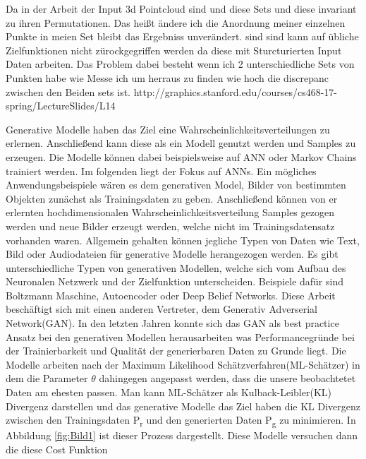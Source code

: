 \documentclass{llncs}
\begin{document}
Da in der Arbeit der Input 3d Pointcloud sind und diese Sets und diese invariant zu ihren Permutationen. Das heißt ändere ich die Anordnung meiner einzelnen Punkte in meien Set bleibt das Ergebniss unverändert.  sind sind kann auf übliche Zielfunktionen nicht zürockgegriffen werden da diese mit Sturcturierten Input Daten arbeiten. Das Problem dabei besteht wenn ich 2 unterschiedliche Sets von Punkten habe wie Messe ich um herraus zu finden wie hoch die discrepanc zwischen den Beiden sets ist. 
http://graphics.stanford.edu/courses/cs468-17-spring/LectureSlides/L14%

Generative Modelle haben das Ziel eine Wahrscheinlichkeitsverteilungen zu erlernen. Anschließend kann diese als ein Modell genutzt werden und Samples zu erzeugen. Die Modelle können dabei beispielsweise auf ANN oder Markov Chains trainiert werden\cite{Grundlagen}. Im folgenden liegt der Fokus auf ANNs. Ein mögliches Anwendungsbeispiele wären es dem generativen Model, Bilder von bestimmten Objekten zunächst als Trainingsdaten zu geben. Anschließend können von er erlernten hochdimensionalen Wahrscheinlichkeitsverteilung Samples gezogen werden und neue Bilder erzeugt werden, welche nicht im Trainingsdatensatz vorhanden waren. Allgemein gehalten können jegliche Typen von Daten wie Text, Bild oder Audiodateien für generative Modelle herangezogen werden. Es gibt unterschiedliche Typen von generativen Modellen, welche sich vom Aufbau des Neuronalen Netzwerk und der Zielfunktion unterscheiden. Beispiele dafür sind Boltzmann Maschine, Autoencoder oder Deep Belief Networks\cite{Grundlagen}. Diese Arbeit beschäftigt sich mit einen anderen Vertreter, dem Generativ Adverserial Network(GAN). In den letzten Jahren konnte sich das GAN als best practice Ansatz bei den generativen Modellen herausarbeiten was Performancegründe bei der Trainierbarkeit und Qualität der generierbaren Daten zu Grunde liegt\cite{Grundlagen}. 
Die Modelle arbeiten nach der Maximum Likelihood Schätzverfahren(ML-Schätzer) in dem die Parameter $\theta$ dahingegen angepasst werden, dass die unsere beobachtetet Daten am ehesten passen. Man kann ML-Schätzer als Kulback-Leibler(KL) Divergenz darstellen und das generative Modelle das Ziel haben die KL Divergenz zwischen den Trainingsdaten P\textsubscript{r} und den generierten Daten P\textsubscript{g} zu minimieren. In Abbildung \ref{fig:Bild1} ist dieser Prozess dargestellt. Diese Modelle versuchen dann die diese Cost Funktion  
\\
\\
\end{document}
